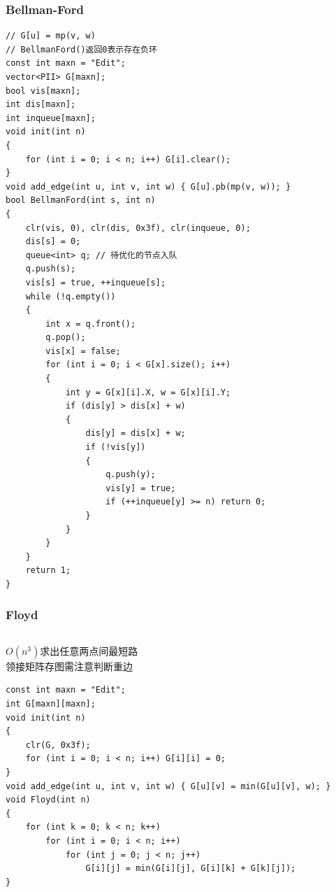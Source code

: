 \documentclass[twoside]{article}
\begin{document}
\subsubsection{Bellman-Ford}
\begin{lstlisting}
// G[u] = mp(v, w)
// BellmanFord()返回0表示存在负环
const int maxn = "Edit";
vector<PII> G[maxn];
bool vis[maxn];
int dis[maxn];
int inqueue[maxn];
void init(int n)
{
    for (int i = 0; i < n; i++) G[i].clear();
}
void add_edge(int u, int v, int w) { G[u].pb(mp(v, w)); }
bool BellmanFord(int s, int n)
{
    clr(vis, 0), clr(dis, 0x3f), clr(inqueue, 0);
    dis[s] = 0;
    queue<int> q; // 待优化的节点入队
    q.push(s);
    vis[s] = true, ++inqueue[s];
    while (!q.empty())
    {
        int x = q.front();
        q.pop();
        vis[x] = false;
        for (int i = 0; i < G[x].size(); i++)
        {
            int y = G[x][i].X, w = G[x][i].Y;
            if (dis[y] > dis[x] + w)
            {
                dis[y] = dis[x] + w;
                if (!vis[y])
                {
                    q.push(y);
                    vis[y] = true;
                    if (++inqueue[y] >= n) return 0;
                }
            }
        }
    }
    return 1;
}
\end{lstlisting}
\subsubsection{Floyd}
\begin{lstlisting}
\end{lstlisting}
$O(n^3)$求出任意两点间最短路\\
领接矩阵存图需注意判断重边
\begin{lstlisting}
const int maxn = "Edit";
int G[maxn][maxn];
void init(int n)
{
    clr(G, 0x3f);
    for (int i = 0; i < n; i++) G[i][i] = 0;
}
void add_edge(int u, int v, int w) { G[u][v] = min(G[u][v], w); }
void Floyd(int n)
{
    for (int k = 0; k < n; k++)
        for (int i = 0; i < n; i++)
            for (int j = 0; j < n; j++)
                G[i][j] = min(G[i][j], G[i][k] + G[k][j]);
}
\end{lstlisting}
\end{document}
